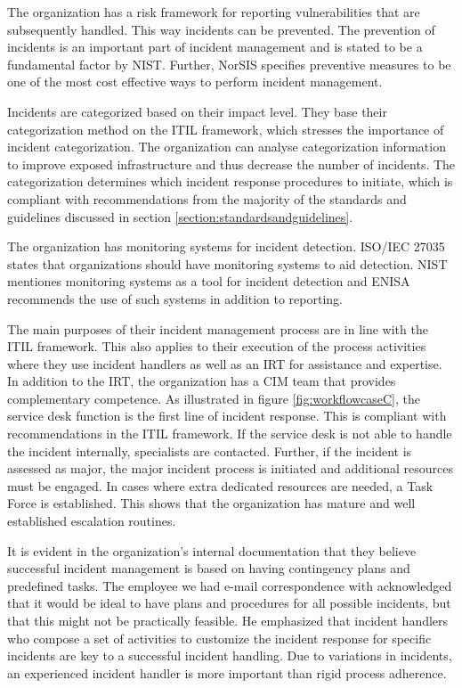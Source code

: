The organization has a risk framework for reporting vulnerabilities that are subsequently handled. This way incidents can be prevented. The prevention of incidents is an important part of incident management and is stated to be a fundamental factor by NIST. Further, NorSIS specifies preventive measures to be one of the most cost effective ways to perform incident management. 

Incidents are categorized based on their impact level. They base their categorization method on the ITIL framework, which stresses the importance of incident categorization. The organization can analyse categorization information to improve exposed infrastructure and thus decrease the number of incidents. The categorization determines which incident response procedures to initiate, which is compliant with recommendations from the majority of the standards and guidelines discussed in section \ref{section:standardsandguidelines}.

The organization has monitoring systems for incident detection. ISO/IEC 27035 states that organizations should have monitoring systems to aid detection. NIST mentiones monitoring systems as a tool for incident detection and ENISA recommends the use of such systems in addition to reporting. 

The main purposes of their incident management process are in line with the ITIL framework. This also applies to their execution of the process activities where they use incident handlers as well as an \ac{IRT} for assistance and expertise. In addition to the IRT, the organization has a \ac{CIM} team that provides complementary competence. As illustrated in figure \ref{fig:workflowcaseC}, the service desk function is the first line of incident response. This is compliant with recommendations in the ITIL framework. If the service desk is not able to handle the incident internally, specialists are contacted. Further, if the incident is assessed as major, the major incident process is initiated and additional resources must be engaged. In cases where extra dedicated resources are needed, a Task Force is established. This shows that the organization has mature and well established escalation routines.

It is evident in the organization's internal documentation that they believe successful incident management is based on having contingency plans and predefined tasks. The employee we had e-mail correspondence with acknowledged that it would be ideal to have plans and procedures for all possible incidents, but that this might not be practically feasible. He emphasized that incident handlers who compose a set of activities to customize the incident response for specific incidents are key to a successful incident handling. Due to variations in incidents, an experienced incident handler is more important than rigid process adherence.

